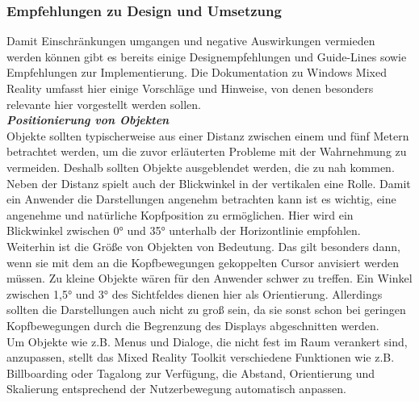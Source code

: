 \subsubsection{Empfehlungen zu Design und Umsetzung}
Damit Einschränkungen umgangen und negative Auswirkungen vermieden werden können gibt es bereits einige Designempfehlungen und Guide-Lines sowie Empfehlungen zur Implementierung. Die Dokumentation zu Windows Mixed Reality umfasst hier einige Vorschläge und Hinweise, von denen besonders relevante hier vorgestellt werden sollen.\\

\textbf{\textit{Positionierung von Objekten}}\\
Objekte sollten typischerweise aus einer Distanz zwischen einem und fünf Metern betrachtet werden, um die zuvor erläuterten Probleme mit der Wahrnehmung zu vermeiden. Deshalb sollten Objekte ausgeblendet werden, die zu nah kommen. Neben der Distanz spielt auch der Blickwinkel in der vertikalen eine Rolle. Damit ein Anwender die Darstellungen angenehm betrachten kann ist es wichtig, eine angenehme und natürliche Kopfposition zu ermöglichen. Hier wird ein Blickwinkel zwischen 0° und 35° unterhalb der Horizontlinie empfohlen.\\

Weiterhin ist die Größe von Objekten von Bedeutung. Das gilt besonders dann, wenn sie mit dem an die Kopfbewegungen gekoppelten Cursor anvisiert werden müssen. Zu kleine Objekte wären für den Anwender schwer zu treffen. Ein Winkel zwischen 1,5° und 3° des Sichtfeldes dienen hier als Orientierung. Allerdings sollten die Darstellungen auch nicht zu groß sein, da sie sonst schon bei geringen Kopfbewegungen durch die Begrenzung des Displays abgeschnitten werden.\\

Um Objekte wie z.B. Menus und Dialoge, die nicht fest im Raum verankert sind, anzupassen, stellt das Mixed Reality Toolkit verschiedene Funktionen wie z.B. Billboarding oder Tagalong zur Verfügung, die Abstand, Orientierung und Skalierung entsprechend der Nutzerbewegung automatisch anpassen.\\

